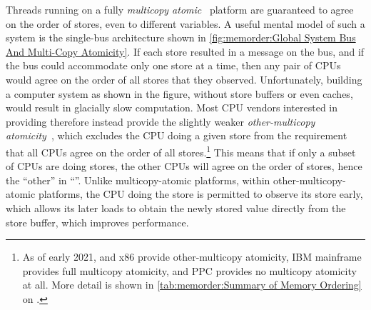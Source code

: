 Threads running on a fully
\emph{multicopy atomic}~\cite{Stone:1995:SP:623262.623912}
platform are guaranteed
to agree on the order of stores, even to different variables.
A useful mental model of such a system is the single-bus architecture
shown in
\cref{fig:memorder:Global System Bus And Multi-Copy Atomicity}.
If each store resulted in a message on the bus, and if the bus could
accommodate only one store at a time, then any pair of CPUs would
agree on the order of all stores that they observed.
Unfortunately, building a computer system as shown in the figure, without
store buffers or even caches, would result in glacially slow computation.
Most CPU vendors interested in providing
 therefore
instead provide the slightly weaker
\emph{other-multicopy atomicity}~\cite[Section B2.3]{ARMv8A:2017},
which excludes the CPU doing a given store from the requirement that all
CPUs agree on the order of all stores.\footnote{
	As of early 2021,  and x86 provide other-multicopy atomicity,
	IBM mainframe provides full multicopy atomicity, and PPC
	provides no multicopy atomicity at all.
	More detail is shown in
	\cref{tab:memorder:Summary of Memory Ordering}
	on
	.}
This means that if only a subset of CPUs are doing stores, the
other CPUs will agree on the order of stores, hence the ``other''
in ``''.
Unlike multicopy-atomic platforms, within other-multicopy-atomic platforms,
the CPU doing the store is permitted to observe its
store early, which allows its later loads to obtain the newly stored
value directly from the store buffer, which improves performance.


